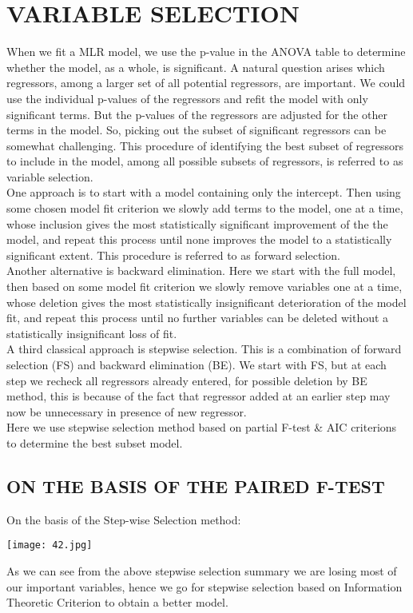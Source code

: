 \documentclass[a4paper,12pt,twoside]{book}
\begin{document}
\section{VARIABLE SELECTION}
When we fit a MLR model, we use the p-value in the ANOVA table to determine whether the model, as a whole, is significant. A natural question arises which regressors, among a larger set of all potential regressors, are important. We could use the individual p-values of the regressors and refit the model with only significant terms. But the p-values of the regressors are adjusted for the other terms in the model. So, picking out the subset of significant regressors can be somewhat challenging. This procedure of identifying the best subset of regressors to include in the model, among all possible subsets of regressors, is referred to as variable selection.\\
One approach is to start with a model containing only the intercept. Then using some chosen model fit criterion we slowly add terms to the model, one at a time, whose inclusion gives the most statistically significant improvement of the the model, and repeat this process until none improves the model to a statistically significant extent. This procedure is referred to as forward selection.\\
Another alternative is backward elimination. Here we start with the full model, then based on some model fit criterion we slowly remove variables one at a time, whose deletion gives the most statistically insignificant deterioration of the model fit, and repeat this process until no further variables can be deleted without a statistically insignificant loss of fit.\\
A third classical approach is stepwise selection. This is a combination of forward selection (FS) and backward elimination (BE). We start with FS, but at each step we recheck all regressors already entered, for possible deletion by BE method, this is because of the fact that regressor added at an earlier step may now be unnecessary in presence of new regressor.\\
Here we use stepwise selection method based on partial F-test \& AIC criterions to determine the best subset model.
\newpage
\subsection*{ON THE BASIS OF THE PAIRED F-TEST}
On the basis of the Step-wise Selection method:
\begin{center}
\texttt{[image: 42.jpg]}\\
\end{center}
As we can see from the above stepwise selection summary we are losing most of our important variables, hence we go for stepwise selection based on Information Theoretic Criterion to obtain a better model.
\newpage
\end{document}

